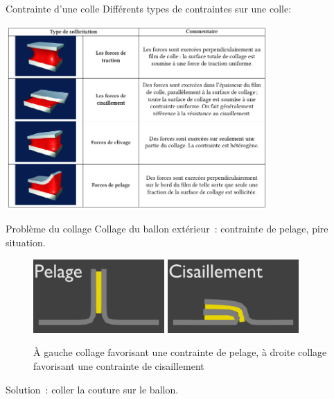 \begin{frame}{Contrainte d'une colle}
  Différents types de contraintes sur une colle:
  \begin{center}
    \includegraphics[width=10cm]{../Images/colle_contraintes.png}
  \end{center}
\end{frame}

\begin{frame}{Problème du collage}
  Collage du ballon extérieur~: contrainte de pelage, pire situation.
  \begin{figure}
    \centering
    \includegraphics[width=5cm]{../Images/colle_pelage.png}
    \includegraphics[width=5cm]{../Images/colle_cisaillement.png}
    \caption{À gauche collage favorisant une contrainte de pelage, à droite collage favorisant une contrainte de cisaillement}
  \end{figure}
  Solution~: coller la couture sur le ballon.
\end{frame}

